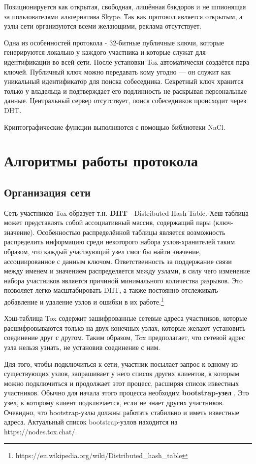 \documentclass{/home/fresheed/utils/latex/university-templates/lab-report}
\begin{document}
Позиционируется как открытая, свободная, лишённая бэкдоров и не шпионящая за пользователями альтернатива Skype. Так как протокол является открытым, а узлы сети организуются всеми желающими, реклама отсутствует. 

Одна из особенностей протокола - 32-битные публичные ключи, которые генерируются локально у каждого участника и которые служат для идентификации во всей сети. После установки Tox автоматически создаётся пара ключей. Публичный ключ можно передавать кому угодно — он служит как уникальный идентификатор для поиска собеседника. Секретный ключ хранится только у владельца и подтверждает его подлинность не раскрывая персональные данные. Центральный сервер отсутствует, поиск собеседников происходит через DHT.

Криптографические функции выполняются с помощью библиотеки NaCl.


\section{Алгоритмы работы протокола}

\newcommand{\defn}[1]{
  \textbf{#1}
}

\subsection{Организация сети}

Сеть участников Tox образует т.н. \defn{DHT} - Distributed Hash Table. 
Хеш-таблица может представлять собой ассоциативный массив, содержащий пары (ключ-значение). Особенностью распределённой таблицы является возможность распределить информацию среди некоторого набора узлов-хранителей таким образом, что каждый участвующий узел смог бы найти значение, ассоциированное с данным ключом. Ответственность за поддержание связи между именем и значением распределяется между узлами, в силу чего изменение набора участников является причиной минимального количества разрывов. Это позволяет легко масштабировать DHT, а также постоянно отслеживать добавление и удаление узлов и ошибки в их работе.\footnote{https://en.wikipedia.org/wiki/Distributed\_hash\_table}

Хэш-таблица Tox содержит зашифрованные сетевые адреса участников, которые расшифровываются только на двух конечных узлах, которые желают установить соединение друг с другом. Таким образом, Tox предполагает, что сетевой адрес узла нельзя узнать, не установив соединение с ним. 

Для того, чтобы подключиться к сети, участник посылает запрос к одному из существующих узлов, запрашивает у него список других клиентов, к которым можно подключиться и продолжает этот процесс, расширяя список известных участников. Обычно для начала этого процесса необходим \defn{bootstrap-узел}. Это узел, к которому клиент подключается, если не знает других участников. Очевидно, что bootstrap-узлы должны работать стабильно и иметь известные адреса. Актуальный список bootstrap-узлов находится на https://nodes.tox.chat/.
\end{document}
